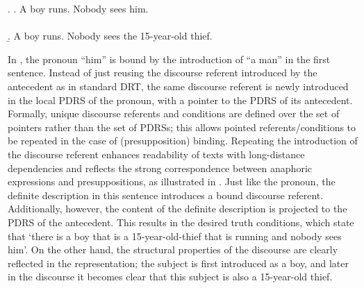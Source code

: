 \begin{flushleft}
\begin{minipage}{0.95\linewidth}
\begin{multicols}{2}
\ex. \a. A boy runs. Nobody sees him.\\\\
\columnbreak
\b. A boy runs. Nobody sees the 15-year-old thief.\\
\hspace*{-0.8cm}
{\small
}

\end{multicols}
\end{minipage}
\end{flushleft}

\noindent In \Last[a], the pronoun ``him'' is bound by the introduction of
``a man'' in the first sentence. Instead of just reusing the discourse
referent introduced by the antecedent as in standard DRT, the same discourse
referent is newly introduced in the local PDRS of the pronoun, with
a pointer to the PDRS of its antecedent.  Formally, unique discourse
referents and conditions are defined over the set of pointers rather than
the set of PDRSs; this allows pointed referents/conditions to be repeated in
the case of (presupposition) binding.  Repeating the introduction of the
discourse referent enhances readability of texts with long-distance
dependencies and reflects the strong correspondence between anaphoric
expressions and presuppositions, as illustrated in \Last[b]. Just like the
pronoun, the definite description in this sentence introduces a bound
discourse referent. Additionally, however, the content of the definite
description is projected to the PDRS of the antecedent. This results in the
desired truth conditions, which state that `there is a boy that is
a 15-year-old-thief that is running and nobody sees him'. On the other hand,
the structural properties of the discourse are clearly reflected in the
representation; the subject is first introduced as a boy, and later in the
discourse it becomes clear that this subject is also a 15-year-old thief.

